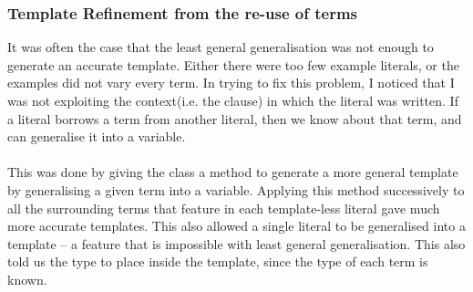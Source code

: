 \documentclass[../main.tex]{subfiles}
\begin{document}
\subsubsection{Template Refinement from the re-use of terms}
It was often the case that the least general generalisation was not enough to generate an accurate template. Either there were too few example literals, or the examples did not vary every term. In trying to fix this problem, I noticed that I was not exploiting the context(i.e. the clause) in which the literal was written. If a literal borrows a term from another literal, then we know about that term, and can generalise it into a variable.
\\
\\
This was done by giving the  class a method to generate a more general template by generalising a given term into a variable. Applying this method successively to all the surrounding terms that feature in each template-less literal gave much more accurate templates. This also allowed a single literal to be generalised into a template -- a feature that is impossible with least general generalisation. This also told us the type to place inside the template, since the type of each term is known.
\end{document}
